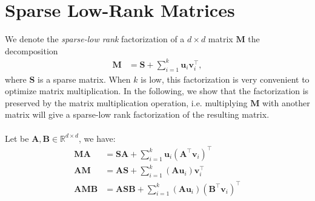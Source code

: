 \section{Sparse Low-Rank Matrices}

We denote the \emph{sparse-low rank} factorization of a $d \times d$
matrix $\mathbf{M}$ the decomposition
\begin{align}
    \mathbf{M} &= \mathbf{S} + \sum_{i=1}^k \mathbf{u}_i \mathbf{v}_i^\top,
\end{align}
where $\mathbf{S}$ is a sparse matrix. When $k$ is low, this
factorization is very convenient to optimize matrix multiplication. In
the following, we show that the factorization is preserved by the matrix
multiplication operation, i.e. multiplying $\mathbf{M}$ with another
matrix will give a sparse-low rank factorization of the resulting matrix.

\paragraph{} Let be $\mathbf{A}, \mathbf{B} \in \mathbb{R}^{d\times d}$,
we have:
\begin{align}
    \mathbf{M} \mathbf{A} &= \mathbf{S} \mathbf{A}
        + \sum_{i=1}^k \mathbf{u}_i (\mathbf{A}^\top \mathbf{v}_i)^\top \\
    \mathbf{A} \mathbf{M} &= \mathbf{A} \mathbf{S}
        + \sum_{i=1}^k (\mathbf{A} \mathbf{u}_i) \mathbf{v}_i^\top \\
    \mathbf{A} \mathbf{M} \mathbf{B} &= \mathbf{A} \mathbf{S} \mathbf{B}
        + \sum_{i=1}^k (\mathbf{A} \mathbf{u}_i) (\mathbf{B}^\top \mathbf{v}_i)^\top
\end{align}

